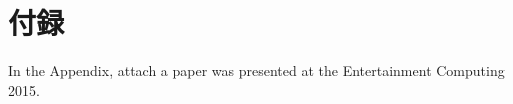 \renewcommand{\bibname}{参考文献}







\newpage
\chapter*{付録}\label{huroku}

\begin{flushleft}
In the Appendix, attach a paper was presented at the Entertainment Computing 2015.
\end{flushleft}

\newpage

\pagestyle{empty}

